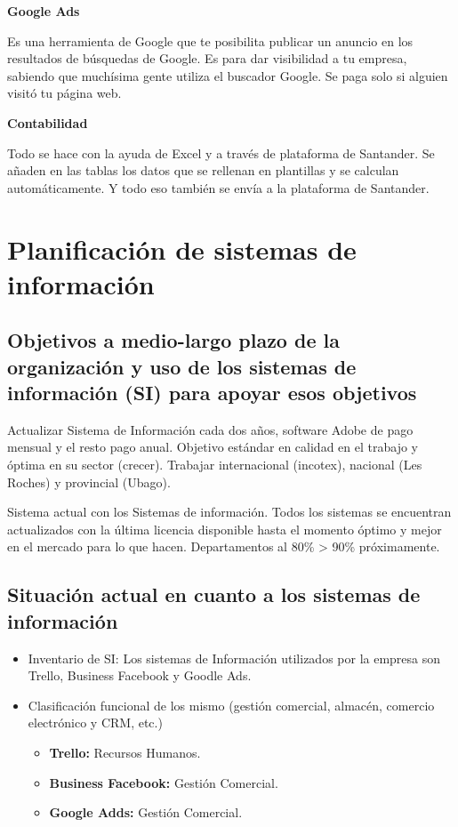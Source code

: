 \documentclass{article}
\begin{document}
\vspace{5mm}

\textbf{Google Ads}

Es una herramienta de Google que te posibilita publicar un anuncio en los resultados de búsquedas de Google. Es para dar visibilidad a tu empresa, sabiendo que muchísima gente utiliza el buscador Google. Se paga solo si alguien visitó tu página web. 

\vspace{5mm}

\textbf{Contabilidad}

Todo se hace con la ayuda de Excel y a través de plataforma de Santander. Se añaden en las tablas los datos que se rellenan en plantillas y se calculan automáticamente. Y todo eso también se envía a la plataforma de Santander.

\section{Planificación de sistemas de información}

\subsection{Objetivos a medio-largo plazo de la organización y uso de los sistemas de información (SI) para apoyar esos objetivos}

Actualizar Sistema de Información cada dos años, software Adobe de pago
mensual y el resto pago anual.
Objetivo estándar en calidad en el trabajo y óptima en su sector (crecer).
Trabajar internacional (incotex), nacional (Les Roches) y provincial
(Ubago).

Sistema actual con los Sistemas de información. Todos los sistemas se
encuentran actualizados con la última licencia disponible hasta el momento
óptimo y mejor en el mercado para lo que hacen.
Departamentos al 80\% \setminus> 90\% próximamente.

\subsection{Situación actual en cuanto a los sistemas de información}

\begin{itemize}
\item Inventario de SI: Los sistemas de Información utilizados por la empresa son Trello, Business Facebook y Goodle Ads.
\item Clasificación funcional de los mismo (gestión comercial, almacén, comercio electrónico y CRM, etc.)
\begin{itemize}
\item \textbf{Trello:}  Recursos Humanos.  
\item \textbf{Business Facebook:} Gestión Comercial. 
\item \textbf{Google Adds:} Gestión Comercial. 
\end{itemize}
\end{itemize}
\end{document}
